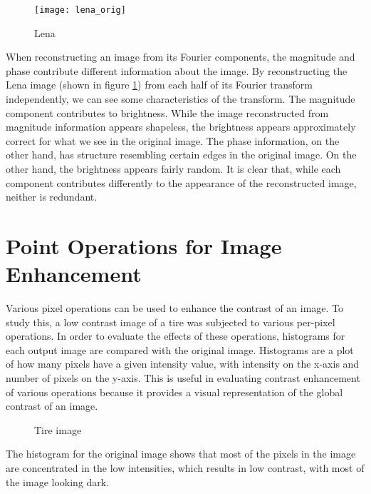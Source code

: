 \documentclass{sydeStyle}
\begin{document}
\begin{figure}
	\begin{center}
		\texttt{[image: lena\_orig]}
	\end{center}
	\caption{Lena}
	\label{fig:lena}
\end{figure}

When reconstructing an image from its Fourier components, the magnitude and phase contribute different information about the image.
By reconstructing the Lena image (shown in figure \ref{fig:lena}) from each half of its Fourier transform independently, we can see some characteristics of the transform.
The magnitude component contributes to brightness.  While the image reconstructed from magnitude information appears shapeless, the brightness appears approximately correct for what we see in the original image.
The phase information, on the other hand, has structure resembling certain edges in the original image.  On the other hand, the brightness appears fairly random.
It is clear that, while each component contributes differently to the appearance of the reconstructed image, neither is redundant.


\section*{Point Operations for Image Enhancement}
Various pixel operations can be used to enhance the contrast of an image.
To study this, a low contrast image of a tire was subjected to various per-pixel
operations.
In order to evaluate the effects of these operations, histograms for each output
image are compared with the original image.
Histograms are a plot of how many pixels have a given intensity value, with
intensity on the x-axis and number of pixels on the y-axis.
This is useful in evaluating contrast enhancement of various operations because
it provides a visual representation of the global contrast of an image.
 \begin{figure}
	\begin{center}
	\end{center}
	\caption{Tire image}
\end{figure}

The histogram for the original image shows that most of the pixels in the image
are concentrated in the low intensities, which results in low contrast, with
most of the image looking dark.
\end{document}
